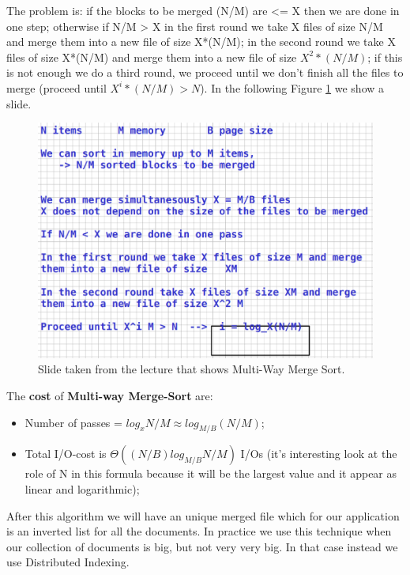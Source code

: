 The problem is: if the blocks to be merged (N/M) are <= X then we are done in one step; otherwise if N/M > X in the first round we take X files of size N/M and merge them into a new file of size X*(N/M); in the second round we take X files of size X*(N/M) and merge them into a new file of size $X^2*(N/M)$; if this is not enough we do a third round, we proceed until we don't finish all the files to merge (proceed until $X^i*(N/M)>N$). In the following Figure \ref{fig:multistep} we show a slide.\newline
\begin{figure}
    \centering
    \includegraphics[width=0.75\linewidth]{images/multistep.png}
    \caption{Slide taken from the lecture that shows Multi-Way Merge Sort.}
    \label{fig:multistep}
\end{figure}
The \textbf{cost} of \textbf{Multi-way Merge-Sort} are:
\begin{itemize}
    \item Number of passes = $log_x N/M \approx log_{M/B} (N/M)$;
    \item Total I/O-cost is $\Theta ((N/B)log_{M/B} N/M)$ I/Os (it's interesting look at the role of N in this formula because it will be the largest value and it appear as linear and logarithmic);
\end{itemize}
After this algorithm we will have an unique merged file which for our application is an inverted list for all the documents.\newline
In practice we use this technique when our collection of documents is big, but not very very big. In that case instead we use Distributed Indexing.
